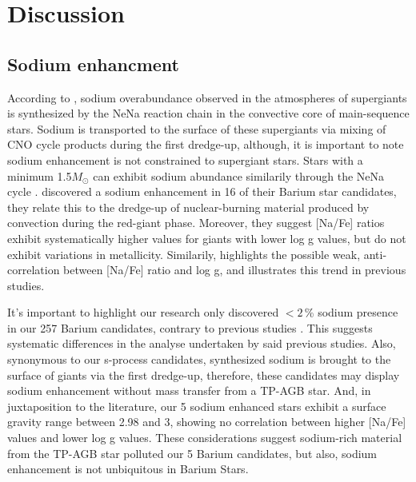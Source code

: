 \documentclass[a4paper,fleqn,usenatbib]{mnras}
\begin{document}
\section{Discussion}  \label{sec:dis}

\subsection{Sodium enhancment}
According to \citet{el1995}, sodium overabundance observed in the atmospheres of supergiants is synthesized by the NeNa reaction chain in the convective core of main-sequence stars. Sodium is transported to the surface of these supergiants via mixing of CNO cycle products during the first dredge-up, although, it is important to note sodium enhancement is not constrained to supergiant stars. Stars with a  minimum 1.5$M_\odot$ can exhibit sodium abundance similarily through the NeNa cycle \citep{denissenkov1987}. \citet{antipova2004} discovered a sodium enhancement in 16 of their Barium star candidates, they relate this to the dredge-up of nuclear-burning material produced by convection during the red-giant phase. Moreover, they suggest [Na/Fe] ratios exhibit systematically higher values for giants with lower log g values, but do not exhibit variations in metallicity. Similarily, \citet{decastro2016} highlights the possible weak, anti-correlation between [Na/Fe] ratio and log g, and illustrates this trend in previous studies\citep[e.g.][]{boyarchuk2002,mishenina2006,luck2007,takeda2008}.

It's important to highlight our research only discovered $<2$\,\% sodium presence in our 257 Barium candidates, contrary to previous studies \citep[e.g.][]{decastro2016}. This suggests systematic differences in the analyse undertaken by said previous studies. Also, synonymous to our s-process candidates, synthesized sodium is brought to the surface of giants via the first dredge-up, therefore, these candidates may display sodium enhancement without mass transfer from a TP-AGB star. And, in juxtaposition to the literature, our 5 sodium enhanced stars exhibit a surface gravity range between 2.98 and 3, showing no correlation between higher [Na/Fe] values and lower log g values. These considerations suggest sodium-rich material from the TP-AGB star polluted our 5 Barium candidates, but also, sodium enhancement is not unbiquitous in Barium Stars. 
\end{document}
